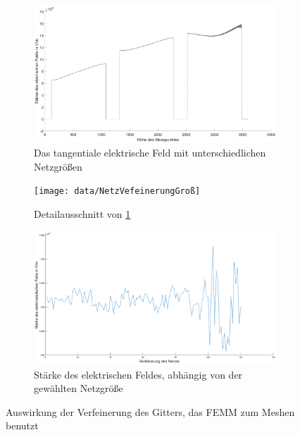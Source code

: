 \begin{figure}
	\centering
	\begin{subfigure}[h]{.8\textwidth}
		\centering
		\includegraphics[width=\textwidth]{data/NetzVefeinerung}
		\vspace*{-28pt}
		\caption{Das tangentiale elektrische Feld mit unterschiedlichen Netzgrößen}
		\label{fig:Netz}
		
	\end{subfigure}
	
	\begin{subfigure}[h]{.8\textwidth}
		\centering
		\texttt{[image: data/NetzVefeinerungGroß]}
		\caption{Detailausschnitt von \ref{fig:Netz}}
		\label{fig:NetzGroß}
	\end{subfigure}
	
	\begin{subfigure}[h]{.8\textwidth}
		\centering
		\includegraphics[width=\textwidth]{data/NetzVergleich}
		\caption{Stärke des elektrischen Feldes, abhängig von der gewählten Netzgröße}
		\label{fig:NetzVGL}
	\end{subfigure}
	\caption{Auswirkung der Verfeinerung des Gitters, das FEMM zum Meshen benutzt}
	
\end{figure}

